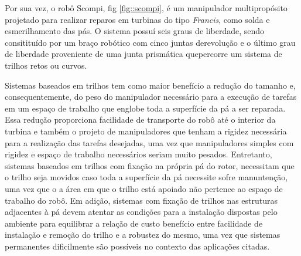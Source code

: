 Por sua vez, o robô Scompi, fig \ref{fig::scompi}, é um manipulador
multipropósito projetado para realizar reparos em turbinas do tipo \textit{Francis}, como solda e
esmerilhamento das pás. O sistema possuí seis graus de liberdade, sendo 
consitituído por um braço robótico com cinco juntas derevolução e o último grau
 de liberdade proveniente de uma junta prismática quepercorre um sistema de 
 trilhos retos ou curvos. 


Sistemas baseados em trilhos tem como maior benefício a redução do tamanho e,
consequentemente, do peso do manipulador necessário para a execução de tarefas
em um espaço de trabalho que englobe toda a superfície da pá a ser reparada.
Essa redução proporciona facilidade de transporte do robô até o interior da
turbina e também o projeto de manipuladores que tenham a rigidez necessária para
a realização das tarefas desejadas, uma vez que manipuladores simples com
rigidez e espaço de trabalho necessários seriam muito pesados. Entretanto,
sistemas baseados em trilhos com fixação na própria pá do rotor, necessitam que
o trilho seja movidos caso toda a superfície da pá necessite sofre manuntenção,
uma vez que o a área em que o trilho está apoiado não pertence ao espaço de
trabalho do robô. Em adição, sistemas com fixação de trilhos nas estruturas
adjacentes à pá devem atentar as condições para a instalação dispostas pelo
ambiente para equilibrar a relação de custo benefício entre facilidade de
instalação e remoção do trilho e a robustez do mesmo, uma vez que sistemas
permanentes dificilmente são possíveis no contexto das aplicações citadas.



